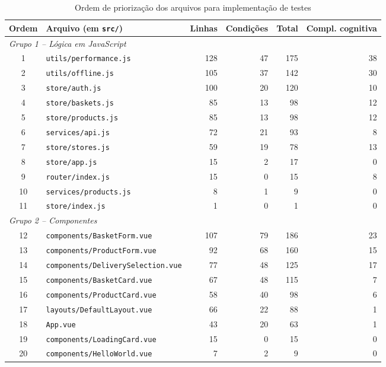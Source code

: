 \begin{table}[htb]
	\centering
	\footnotesize
	\caption{Ordem de priorização dos arquivos para implementação de testes}
	\label{tab:priorizacao}
	\begin{tabular}{clrrrr}
		\hline
		\textbf{Ordem} & \textbf{Arquivo (em \texttt{src/})} & \textbf{Linhas} & \textbf{Condições} & \textbf{Total} & \textbf{Compl. cognitiva} \\
		\hline
		\multicolumn{6}{l}{\textit{Grupo 1 -- Lógica em JavaScript}} \\
		1 & \texttt{utils/performance.js} & 128 & 47 & 175 & 38 \\
		2 & \texttt{utils/offline.js} & 105 & 37 & 142 & 30 \\
		3 & \texttt{store/auth.js} & 100 & 20 & 120 & 10 \\
		4 & \texttt{store/baskets.js} & 85 & 13 & 98 & 12 \\
		5 & \texttt{store/products.js} & 85 & 13 & 98 & 12 \\
		6 & \texttt{services/api.js} & 72 & 21 & 93 & 8 \\
		7 & \texttt{store/stores.js} & 59 & 19 & 78 & 13 \\
		8 & \texttt{store/app.js} & 15 & 2 & 17 & 0 \\
		9 & \texttt{router/index.js} & 15 & 0 & 15 & 8 \\
		10 & \texttt{services/products.js} & 8 & 1 & 9 & 0 \\
		11 & \texttt{store/index.js} & 1 & 0 & 1 & 0 \\
		\hline
		\multicolumn{6}{l}{\textit{Grupo 2 -- Componentes}} \\
		12 & \texttt{components/BasketForm.vue} & 107 & 79 & 186 & 23 \\
		13 & \texttt{components/ProductForm.vue} & 92 & 68 & 160 & 15 \\
		14 & \texttt{components/DeliverySelection.vue} & 77 & 48 & 125 & 17 \\
		15 & \texttt{components/BasketCard.vue} & 67 & 48 & 115 & 7 \\
		16 & \texttt{components/ProductCard.vue} & 58 & 40 & 98 & 6 \\
		17 & \texttt{layouts/DefaultLayout.vue} & 66 & 22 & 88 & 1 \\
		18 & \texttt{App.vue} & 43 & 20 & 63 & 1 \\
		19 & \texttt{components/LoadingCard.vue} & 15 & 0 & 15 & 0 \\
		20 & \texttt{components/HelloWorld.vue} & 7 & 2 & 9 & 0 \\

\end{tabular}
\end{table}
